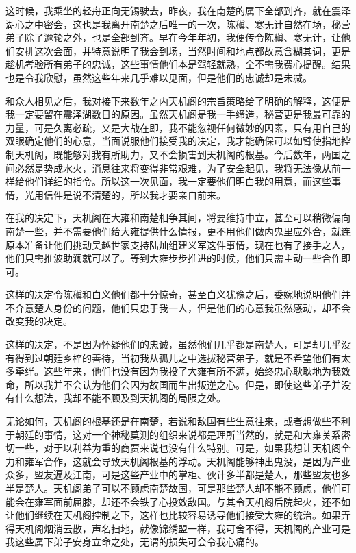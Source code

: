 这时候，我乘坐的轻舟正向无锡驶去，昨夜，我在南楚的属下全部到齐，就在震泽湖心之中密会，这也是我离开南楚之后唯一的一次，陈稹、寒无计自然在场，秘营弟子除了逾轮之外，也是全部到齐。早在今年年初，我便传令陈稹、寒无计，让他们安排这次会面，并特意说明了我会到场，当然时间和地点都故意含糊其词，更是趁机考验所有弟子的忠诚，这些事情他们本是驾轻就熟，全不需我费心提醒。结果也是令我欣慰，虽然这些年来几乎难以见面，但是他们的忠诚却是未减。

和众人相见之后，我对接下来数年之内天机阁的宗旨策略给了明确的解释，这便是我一定要留在震泽湖数日的原因。虽然天机阁是我一手缔造，秘营更是我最可靠的力量，可是久离必疏，又是大战在即，我不能忽视任何微妙的因素，只有用自己的双眼确定他们的心意，当面说服他们接受我的决定，我才能确保可以如臂使指地控制天机阁，既能够对我有所助力，又不会损害到天机阁的根基。今后数年，两国之间必然是势成水火，消息往来将变得非常艰难，为了安全起见，我将无法像从前一样给他们详细的指令。所以这一次见面，我一定要他们明白我的用意，而这些事情，光用信件是说不清楚的，所以我才要亲自前来。

在我的决定下，天机阁在大雍和南楚相争其间，将要维持中立，甚至可以稍微偏向南楚一些，并不需要他们给大雍提供什么情报，更不用他们做内鬼里应外合，就连原本准备让他们挑动吴越世家支持陆灿组建义军这件事情，现在也有了接手之人，他们只需推波助澜就可以了。等到大雍步步推进的时候，他们只需主动一些合作即可。

这样的决定令陈稹和白义他们都十分惊奇，甚至白义犹豫之后，委婉地说明他们并不介意楚人身份的问题，他们只忠于我一人，但是他们的心意我虽然感动，却不会改变我的决定。

这样的决定，不是因为怀疑他们的忠诚，虽然他们几乎都是南楚人，可是却几乎没有得到过朝廷乡梓的善待，当初我从孤儿之中选拔秘营弟子，就是不希望他们有太多牵绊。这些年来，他们也没有因为我投了大雍有所不满，始终忠心耿耿地为我效命，所以我并不会认为他们会因为故国而生出叛逆之心。但是，即使这些弟子并没有什么想法，我却不能不顾及到天机阁的局限之处。

无论如何，天机阁的根基还是在南楚，若说和敌国有些生意往来，或者想做些不利于朝廷的事情，这对一个神秘莫测的组织来说都是理所当然的，就是和大雍关系密切一些，对于以利益为重的商贾来说也没有什么特别。可是，如果我想让天机阁全力和雍军合作，这就会导致天机阁根基的浮动。天机阁能够神出鬼没，是因为产业众多，盟友遍及江南，可是这些产业中的掌柜、伙计多半都是楚人，那些盟友也多半是楚人。天机阁弟子可以不顾虑南楚故国，可是那些楚人却不能不顾虑，他们可能会在雍军面前屈膝，却还不会铁了心投效敌国。与其令天机阁后院起火，还不如让他们继续在天机阁控制之下，这样也比较容易诱导他们接受大雍的统治。如果弄得天机阁烟消云散，声名扫地，就像锦绣盟一样，我可舍不得，天机阁的产业可是我这些属下弟子安身立命之处，无谓的损失可会令我心痛的。

